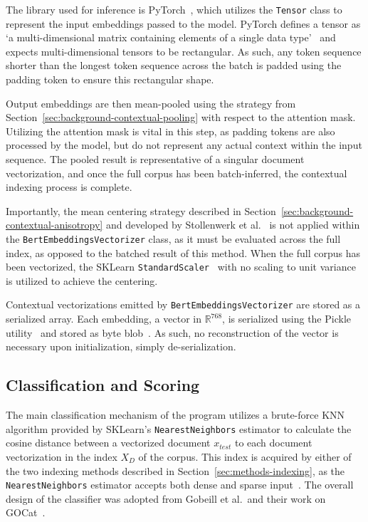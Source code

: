\documentclass[11pt]{article}
\theoremstyle{plain}
\theoremstyle{definition}
\begin{document}
The library used for inference is PyTorch~\cite{ansel/2024/pytorch}, which utilizes the \verb|Tensor| class to represent the input embeddings passed to the model. PyTorch defines a tensor as `a multi-dimensional matrix containing elements of a single data type'~\cite{pytorch/2026/tensor} and expects multi-dimensional tensors to be rectangular. As such, any token sequence shorter than the longest token sequence across the batch is padded using the padding token to ensure this rectangular shape.

Output embeddings are then mean-pooled using the strategy from Section~\ref{sec:background-contextual-pooling} with respect to the attention mask. Utilizing the attention mask is vital in this step, as padding tokens are also processed by the model, but do not represent any actual context within the input sequence. The pooled result is representative of a singular document vectorization, and once the full corpus has been batch-inferred, the contextual indexing process is complete.

Importantly, the mean centering strategy described in Section~\ref{sec:background-contextual-anisotropy}  and developed by Stollenwerk et al.\ \cite{stollenwerk/2026/output} is not applied within the \verb|BertEmbeddingsVectorizer| class, as it must be evaluated across the full index, as opposed to the batched result of this method. When the full corpus has been vectorized, the SKLearn \verb|StandardScaler|~\cite{sklearn/2026/standardscaler} with no scaling to unit variance is utilized to achieve the centering.

Contextual vectorizations emitted by \verb|BertEmbeddingsVectorizer| are stored as a serialized array. Each embedding, a vector in $\mathbb{R}^{768}$, is serialized using the Pickle utility~\cite{python/2026/pickle} and stored as byte blob~\cite{sqlite/2026/datatypes}. As such, no reconstruction of the vector is necessary upon initialization, simply de-serialization.

\subsection{Classification and Scoring}\label{sec:methods-scoring}

The main classification mechanism of the program utilizes a brute-force KNN algorithm provided by SKLearn's \verb|NearestNeighbors| estimator to calculate the cosine distance between a vectorized document $x_{test}$ to each document vectorization in the index $X_D$ of the corpus. This index is acquired by either of the two indexing methods described in Section~\ref{sec:methods-indexing}, as the \verb|NearestNeighbors| estimator accepts both dense and sparse input~\cite{sklearn/2026/nearestneighbors}. The overall design of the classifier was adopted from Gobeill et al.\ and their work on GOCat~\cite{gobeill/2013/managing}.
\end{document}

